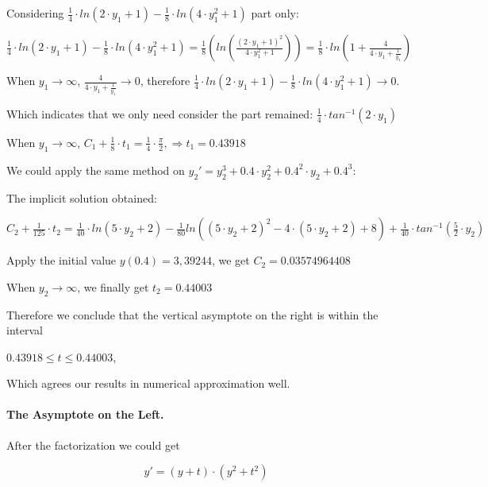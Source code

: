 \documentclass[11pt,a4paper]{article}
\begin{document}
	Considering $\frac{1}{4} \cdot ln(2 \cdot y_1 + 1)-\frac{1}{8}\cdot ln(4 \cdot y_1^2+1)$ part only:
	
	\begin{center}
		$\frac{1}{4} \cdot ln(2\cdot y_1 + 1)- \frac{1}{8}\cdot ln(4\cdot y_1^2+1) = \frac{1}{8}(ln(\frac{(2\cdot y_1+1)^2}{4\cdot y_1^2+1}))=\frac{1}{8}\cdot ln(1+\frac{4}{4\cdot y_1+\frac{1}{y_1}})$
	\end{center}
	
	When $y_1 \rightarrow \infty$, $\frac{4}{4\cdot y_1+\frac{1}{y_1}}\rightarrow 0$, therefore $\frac{1}{4} \cdot ln(2 \cdot y_1 + 1)-\frac{1}{8}\cdot ln(4\cdot y_1^2+1) \rightarrow 0$.
	
	Which indicates that we only need consider the part remained: $\frac{1}{4} \cdot tan^{-1}(2\cdot y_1)$
	
	When $y_1 \rightarrow \infty$, $C_1+ \frac{1}{8}\cdot t_1 = \frac{1}{4} \cdot \frac{\pi}{2}, \Rightarrow t_1 = 0.43918$
	
	We could apply the same method on $y_2' = y_2^3 + 0.4 \cdot y_2^2 + 0.4^2 \cdot y_2 + 0.4 ^3$:
	
	The implicit solution obtained:
	
	\begin{center}
		$C_2 + \frac{1}{125}\cdot t_2 = \frac{1}{40}\cdot ln(5\cdot y_2 + 2)- \frac{1}{80}ln((5\cdot y_2+2)^2 - 4\cdot(5\cdot y_2 + 2)+8)+ \frac{1}{40}\cdot tan^{-1}(\frac{5}{2}\cdot y_2)$
	\end{center}
	
	Apply the initial value $y(0.4)=3,39244$, we get $C_2=0.03574964408$
	
	When $y_2 \rightarrow \infty$, we finally get $t_2=0.44003$
	
	Therefore we conclude that the vertical asymptote on the right is within the interval 
	
	\begin{center}
		$0.43918 \leq t \leq 0.44003$, 
	\end{center}
	
	Which agrees our results in numerical approximation well.
	
	
	\paragraph{The Asymptote on the Left.}	After the factorization we could get
	\begin{center}
		\begin{equation}
			y'=(y+t)\cdot (y^2 + t^2) \tag{Equ 2.3.2.1} \label{Equ.2.3.2.1}
		\end{equation}
	\end{center}
\end{document}
